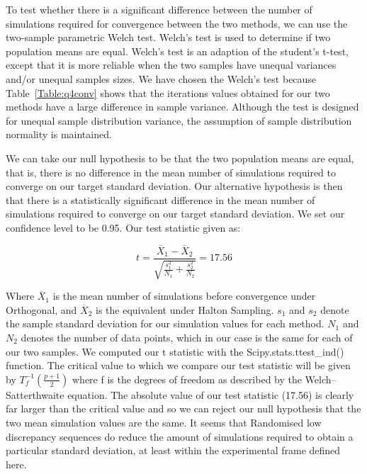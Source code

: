 \documentclass{article}
\begin{document}
    To test whether there is a significant difference between the number of simulations required for convergence between the two methods, we can use the two-sample parametric Welch test. Welch's test is used to determine if two population means are equal. Welch's test is an adaption of the student's t-test, except that it is more reliable when the two samples have unequal variances and/or unequal samples sizes. We have chosen the Welch's test because Table~\ref{Table:q4conv} shows that the iterations values obtained for our two methods have a large difference in sample variance. Although the test is designed for unequal sample distribution variance, the assumption of sample distribution normality is maintained.

    We can take our null hypothesis to be that the two population means are equal, that is, there is no difference in the mean number of simulations required to converge on our target standard deviation. Our alternative hypothesis is then that there is a statistically significant difference in the mean number of simulations required to converge on our target standard deviation. We set our confidence level to be 0.95. Our test statistic given as:

    \begin{equation}
        t = \frac{\overline{X}_1 - \overline{X}_2}{\sqrt{\frac{s_1^2}{N_1} + \frac{s_2^2}{N_2}}} = 17.56
    \end{equation}

    Where $\overline{X}_1$ is the mean number of simulations before convergence under Orthogonal, and $\overline{X}_2$ is the equivalent under Halton Sampling. $s_1$ and $s_2$ denote the sample standard deviation for our simulation values for each method. $N_1$ and $N_2$ denotes the number of data points, which in our case is the same for each of our two samples. We computed our t statistic with the Scipy.stats.ttest\_ind() function. The critical value to which we compare our test statistic will be given by $T^{-1}_{f}(\frac{p + 1}{2})$ where f is the degrees of freedom as described by the Welch–Satterthwaite equation. The absolute value of our test statistic (17.56) is clearly far larger than the critical value and so we can reject our null hypothesis that the two mean simulation values are the same. It seems that Randomised low discrepancy sequences do reduce the amount of simulations required to obtain a particular standard deviation, at least within the experimental frame defined here.\\
\end{document}
